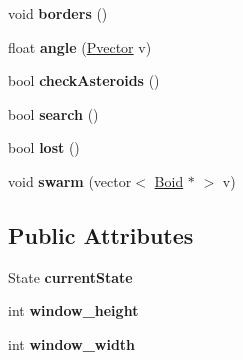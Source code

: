 \begin{DoxyCompactItemize}
\item 
void {\bfseries borders} ()\hypertarget{class_swarmer_a174e66d0bd98c3fc9478b3d3b901ed0a}{}\label{class_swarmer_a174e66d0bd98c3fc9478b3d3b901ed0a}

\item 
float {\bfseries angle} (\hyperlink{class_pvector}{Pvector} v)\hypertarget{class_swarmer_a416ea6dfaffedd2f5c054aa8ffd0802c}{}\label{class_swarmer_a416ea6dfaffedd2f5c054aa8ffd0802c}

\item 
bool {\bfseries check\+Asteroids} ()\hypertarget{class_swarmer_af743b3c533a7d9d801a859b9983a6475}{}\label{class_swarmer_af743b3c533a7d9d801a859b9983a6475}

\item 
bool {\bfseries search} ()\hypertarget{class_swarmer_a791785498a23bcac8b500744c035af2e}{}\label{class_swarmer_a791785498a23bcac8b500744c035af2e}

\item 
bool {\bfseries lost} ()\hypertarget{class_swarmer_ab0dc5f3339157d2fda84f1df986feff6}{}\label{class_swarmer_ab0dc5f3339157d2fda84f1df986feff6}

\item 
void {\bfseries swarm} (vector$<$ \hyperlink{class_boid}{Boid} $\ast$ $>$ v)\hypertarget{class_swarmer_a8b79b199bb0c108cc078af6397e4fa2a}{}\label{class_swarmer_a8b79b199bb0c108cc078af6397e4fa2a}

\end{DoxyCompactItemize}
\subsection*{Public Attributes}
\begin{DoxyCompactItemize}
\item 
State {\bfseries current\+State}\hypertarget{class_swarmer_a81e202572710a9ae0010801411ffc8f6}{}\label{class_swarmer_a81e202572710a9ae0010801411ffc8f6}

\item 
int {\bfseries window\+\_\+height}\hypertarget{class_swarmer_a2de3ae4f634af29497f0bbcab44aec94}{}\label{class_swarmer_a2de3ae4f634af29497f0bbcab44aec94}

\item 
int {\bfseries window\+\_\+width}\hypertarget{class_swarmer_a98494b00ff9dd3dd80a3bfd2257b322a}{}\label{class_swarmer_a98494b00ff9dd3dd80a3bfd2257b322a}

\end{DoxyCompactItemize}


